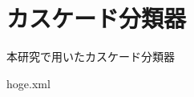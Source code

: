 \chapter{カスケード分類器}
\thispagestyle{fancy}

本研究で用いたカスケード分類器

\vspace{1cm}

hoge.xml

\begin{lstlisting}

\end{lstlisting}

